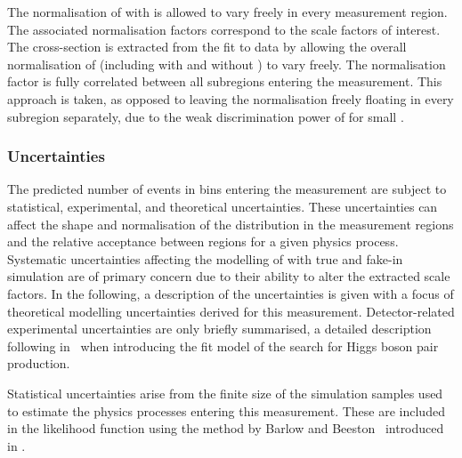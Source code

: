The normalisation of \ttbar with \faketauhadvis is allowed to vary
freely in every measurement region. The associated normalisation
factors correspond to the \faketauhadvis scale factors of
interest. The \ttbar cross-section is extracted from the fit to data
by allowing the overall normalisation of \ttbar (including \ttbar with
and without \faketauhadvis) to vary freely. The \ttbar normalisation
factor is fully correlated between all subregions entering the
measurement. This approach is taken, as opposed to leaving the \ttbar
normalisation freely floating in every subregion separately, due to
the weak discrimination power of \mTW for small \tauhadvis \pT.


\subsubsection{Uncertainties}

The predicted number of events in bins entering the measurement are
subject to statistical, experimental, and theoretical
uncertainties. These uncertainties can affect the shape and
normalisation of the \mTW distribution in the measurement regions and
the relative acceptance between regions for a given physics
process. Systematic uncertainties affecting the modelling of \ttbar
with true and fake-\tauhadvis in simulation are of primary concern due
to their ability to alter the extracted scale factors. In the
following, a description of the uncertainties is given with a focus of
theoretical modelling uncertainties derived for this
measurement. Detector-related experimental uncertainties are only
briefly summarised, a detailed description following
in~ when introducing the fit model of the
search for Higgs boson pair production.

Statistical uncertainties arise from the finite size of the simulation
samples used to estimate the physics processes entering this
measurement. These are included in the likelihood function using the
method by Barlow and Beeston~\cite{barlow1993,conway2011} introduced
in .

